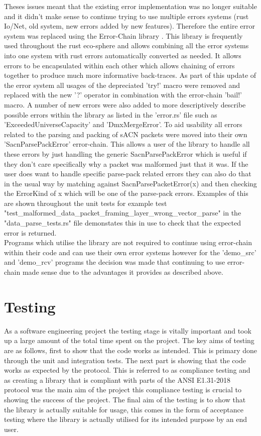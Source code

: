\documentclass[11pt,a4paper]{article}
\begin{document}
Theses issues meant that the existing error implementation was no longer suitable and it didn't make sense to continue trying to use multiple errors systems (rust Io/Net, old system, new errors added by new features). Therefore the entire error system was replaced using the Error-Chain library \cite{ERROR_CHAIN}. This library is frequently used throughout the rust eco-sphere and allows combining all the error systems into one system with rust errors automatically converted as needed. It allows errors to be encapsulated within each other which allows chaining of errors together to produce much more informative back-traces. As part of this update of the error system all usages of the depreciated 'try!' macro were removed and replaced with the new '?' operator in combination with the error-chain 'bail!' macro. A number of new errors were also added to more descriptively describe possible errors within the library as listed in the 'error.rs' file such as 'ExceededUniverseCapacity' and 'DmxMergeError'. To aid usability all errors related to the parsing and packing of sACN packets were moved into their own 'SacnParsePackError' error-chain. This allows a user of the library to handle all these errors by just handling the generic SacnParsePackError which is useful if they don't care specifically why a packet was malformed just that it was. If the user does want to handle specific parse-pack related errors they can also do that in the usual way by matching against SacnParsePacketError(x) and then checking the ErrorKind of x which will be one of the parse-pack errors. Examples of this are shown throughout the unit tests for example test "test\_malformed\_data\_packet\_framing\_layer\_wrong\_vector\_parse" in the "data\_parse\_tests.rs" file demonstates this in use to check that the expected error is returned.\\

Programs which utilise the library are not required to continue using error-chain within their code and can use their own error systems however for the 'demo\_src' and 'demo\_rcv' programs the decision was made that continuing to use error-chain made sense due to the advantages it provides as described above.

\section{Testing}
As a software engineering project the testing stage is vitally important and took up a large amount of the total time spent on the project. The key aims of testing are as follows, first to show that the code works as intended. This is primary done through the unit and integration tests. The next part is showing that the code works as expected by the protocol. This is referred to as compliance testing and as creating a library that is compliant with parts of the ANSI E1.31-2018 protocol was the main aim of the project this compliance testing is crucial to showing the success of the project. The final aim of the testing is to show that the library is actually suitable for usage, this comes in the form of acceptance testing where the library is actually utilised for its intended purpose by an end user.\\
\end{document}
